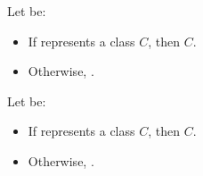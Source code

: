 \begin{itemdescr}
\pnum
Let  be:
\begin{itemize}
\item If  represents a class $C$, then $C$.
\item Otherwise, .
\end{itemize}

\pnum
Let  be:
\begin{itemize}
\item If  represents a class $C$, then $C$.
\item Otherwise, .
\end{itemize}


\end{itemdescr}
